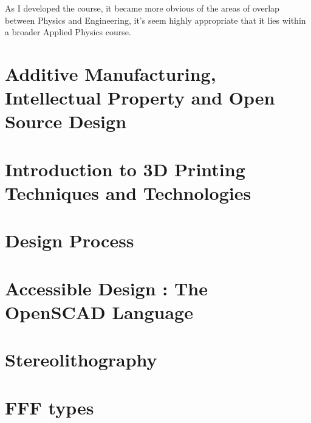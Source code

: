 \documentclass[nols,a4paper,twoside,symmetric,justified,marginals=raggedouter]{tufte-book} %
\begin{document}
As I developed the course, it became more obvious of the areas of overlap between Physics and Engineering, it's seem highly appropriate that it lies within a broader Applied Physics course. 


\chapter{Additive Manufacturing, Intellectual Property and Open Source Design}
\label{ch:society}






\chapter{Introduction to 3D Printing Techniques and Technologies}
\label{ch:intro_tech}



\chapter{Design Process}
\label{ch:design}


\chapter{Accessible Design : The OpenSCAD Language}
\label{ch:openscad}



\chapter{Stereolithography}
\label{ch:fff}


\chapter{FFF types}
\label{ch:fff}

\end{document}
